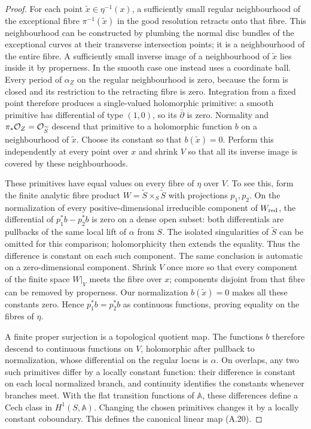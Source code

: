 \begin{proof}
For each point $\widetilde x\in\eta^{-1}(x)$, a sufficiently small regular neighbourhood of the exceptional fibre $\pi^{-1}(\widetilde x)$ in the good resolution retracts onto that fibre. This neighbourhood can be constructed by plumbing the normal disc bundles of the exceptional curves at their transverse intersection points; it is a neighbourhood of the entire fibre. A sufficiently small inverse image of a neighbourhood of $\widetilde x$ lies inside it by properness. In the smooth case one instead uses a coordinate ball. Every period of $\alpha_Z$ on the regular neighbourhood is zero, because the form is closed and its restriction to the retracting fibre is zero. Integration from a fixed point therefore produces a single-valued holomorphic primitive: a smooth primitive has differential of type $(1,0)$, so its $\bar\partial$ is zero. Normality and $\pi_*\mathcal O_Z=\mathcal O_{\widetilde S}$ descend that primitive to a holomorphic function $b$ on a neighbourhood of $\widetilde x$. Choose its constant so that $b(\widetilde x)=0$. Perform this independently at every point over $x$ and shrink $V$ so that all its inverse image is covered by these neighbourhoods.

These primitives have equal values on every fibre of $\eta$ over $V$. To see this, form the finite analytic fibre product
$W=\widetilde S\times_S\widetilde S$ with projections $p_1,p_2$. On the normalization of every positive-dimensional irreducible component of $W_{\rm red}$, the differential of $p_1^*b-p_2^*b$ is zero on a dense open subset: both differentials are pullbacks of the same local lift of $\alpha$ from $S$. The isolated singularities of $\widetilde S$ can be omitted for this comparison; holomorphicity then extends the equality. Thus the difference is constant on each such component. The same conclusion is automatic on a zero-dimensional component. Shrink $V$ once more so that every component of the finite space $W|_V$ meets the fibre over $x$; components disjoint from that fibre can be removed by properness. Our normalization $b(\widetilde x)=0$ makes all these constants zero. Hence $p_1^*b=p_2^*b$ as continuous functions, proving equality on the fibres of $\eta$.

A finite proper surjection is a topological quotient map. The functions $b$ therefore descend to continuous functions on $V$, holomorphic after pullback to normalization, whose differential on the regular locus is $\alpha$. On overlaps, any two such primitives differ by a locally constant function: their difference is constant on each local normalized branch, and continuity identifies the constants whenever branches meet. With the flat transition functions of $\mathbb A$, these differences define a Cech class in $H^1(S,\mathbb A)$. Changing the chosen primitives changes it by a locally constant coboundary. This defines the canonical linear map (A.20).


\end{proof}
